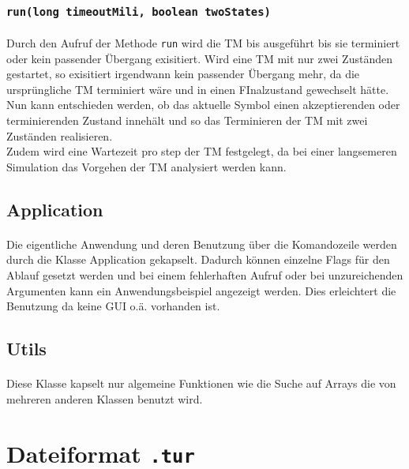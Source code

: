 \documentclass[10pt, a4paper]{article}
\newcommand{\ilc}{\texttt}
\begin{document}
\subsubsection*{\ilc{run(long timeoutMili, boolean twoStates)}}
\paragraph*{}
Durch den Aufruf der Methode \ilc{run} wird die TM bis ausgeführt bis sie terminiert oder kein passender Übergang exisitiert. Wird eine TM mit nur zwei Zuständen gestartet, so exisitiert irgendwann kein passender Übergang mehr, da die ursprüngliche TM terminiert wäre und in einen FInalzustand gewechselt hätte. Nun kann entschieden werden, ob das aktuelle Symbol einen akzeptierenden oder terminierenden Zustand innehält und so das Terminieren der TM mit zwei Zuständen realisieren.\\
Zudem wird eine Wartezeit pro step der TM festgelegt, da bei einer langsemeren Simulation das Vorgehen der TM analysiert werden kann.\par

\subsection*{Application}
\paragraph*{}
Die eigentliche Anwendung und deren Benutzung über die Komandozeile werden durch die Klasse Application gekapselt. Dadurch können einzelne Flags für den Ablauf gesetzt werden und bei einem fehlerhaften Aufruf oder bei unzureichenden Argumenten kann ein Anwendungsbeispiel angezeigt werden. Dies erleichtert die Benutzung da keine GUI o.ä. vorhanden ist.

\subsection*{Utils}
\paragraph*{}
Diese Klasse kapselt nur algemeine Funktionen wie die Suche auf Arrays die von mehreren anderen Klassen benutzt wird.\par
\section*{Dateiformat \ilc{.tur}}
\end{document}
